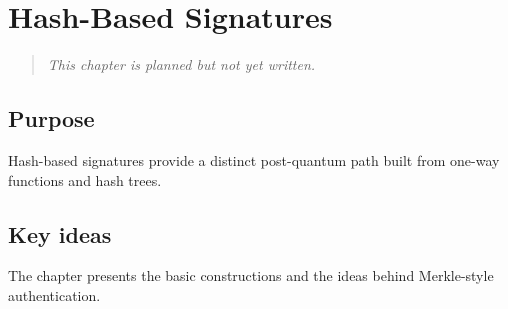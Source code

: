 \chapter{Hash-Based Signatures}

\begin{quote}
\textit{This chapter is planned but not yet written.}
\end{quote}

\section{Purpose}
Hash-based signatures provide a distinct post-quantum path built from one-way functions and hash trees.
\section{Key ideas}
The chapter presents the basic constructions and the ideas behind Merkle-style authentication.
